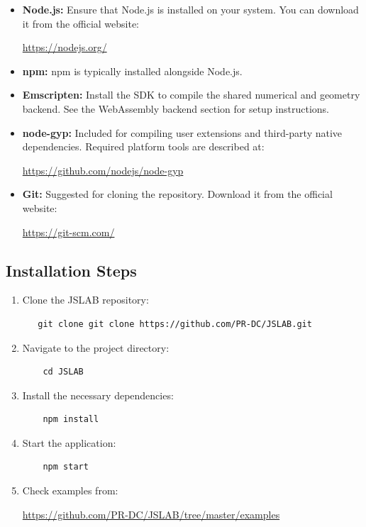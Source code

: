\documentclass[12pt,a4paper]{article}
\begin{document}
\begin{itemize}
    \item \textbf{Node.js:} Ensure that Node.js is installed on your system. You can download it from the official website:

    \url{https://nodejs.org/}

    \item \textbf{npm:} npm is typically installed alongside Node.js.

    \item \textbf{Emscripten:} Install the SDK to compile the shared numerical and geometry backend. See the WebAssembly backend section for setup instructions.

    \item \textbf{node-gyp:} Included for compiling user extensions and third-party native dependencies. Required platform tools are described at:

    \url{https://github.com/nodejs/node-gyp}

    \item \textbf{Git:} Suggested for cloning the repository. Download it from the official website:

    \url{https://git-scm.com/}

\end{itemize}

\subsection{Installation Steps}
\begin{enumerate}
    \item Clone the JSLAB repository:
\begin{verbatim}
   git clone git clone https://github.com/PR-DC/JSLAB.git
\end{verbatim}

    \item Navigate to the project directory:
\begin{verbatim}
    cd JSLAB
\end{verbatim}

    \item Install the necessary dependencies:
\begin{verbatim}
    npm install
\end{verbatim}

    \item Start the application:
\begin{verbatim}
    npm start
\end{verbatim}

    \item Check examples from:

    \url{https://github.com/PR-DC/JSLAB/tree/master/examples}

\end{enumerate}
\end{document}
